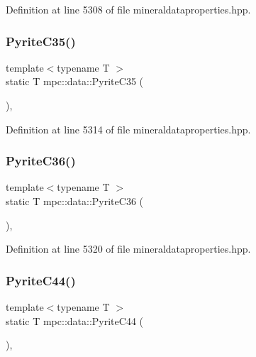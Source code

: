 Definition at line 5308 of file mineraldataproperties.\+hpp.

\mbox{\label{namespacempc_1_1data_afce8e16e07e2c9c3f583d7d217ba2d4d}} 
\subsubsection{\texorpdfstring{Pyrite\+C35()}{PyriteC35()}}
{\footnotesize\ttfamily template$<$typename T $>$ \\
static T mpc\+::data\+::\+Pyrite\+C35 (\begin{DoxyParamCaption}{ }\end{DoxyParamCaption})\hspace{0.3cm}{\ttfamily [inline]}, {\ttfamily [static]}}



Definition at line 5314 of file mineraldataproperties.\+hpp.

\mbox{\label{namespacempc_1_1data_adbd25b0d47394d2ddbc235317a4ba9a4}} 
\subsubsection{\texorpdfstring{Pyrite\+C36()}{PyriteC36()}}
{\footnotesize\ttfamily template$<$typename T $>$ \\
static T mpc\+::data\+::\+Pyrite\+C36 (\begin{DoxyParamCaption}{ }\end{DoxyParamCaption})\hspace{0.3cm}{\ttfamily [inline]}, {\ttfamily [static]}}



Definition at line 5320 of file mineraldataproperties.\+hpp.

\mbox{\label{namespacempc_1_1data_a4a06e515fed13419d31b132550e29f3d}} 
\subsubsection{\texorpdfstring{Pyrite\+C44()}{PyriteC44()}}
{\footnotesize\ttfamily template$<$typename T $>$ \\
static T mpc\+::data\+::\+Pyrite\+C44 (\begin{DoxyParamCaption}{ }\end{DoxyParamCaption})\hspace{0.3cm}{\ttfamily [inline]}, {\ttfamily [static]}}



